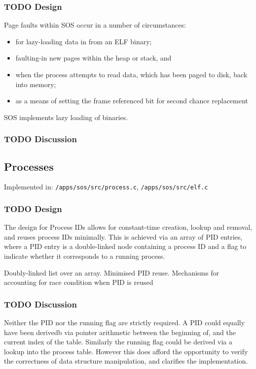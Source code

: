 \documentclass[a4paper,12pt]{article}
\begin{document}
\subsubsection{TODO Design}
Page faults within SOS occur in a number of circumstances:

\begin{itemize}
\item for lazy-loading data in from an ELF binary;
\item faulting-in new pages within the heap or stack, and
\item when the process attempts to read data, which has been paged to disk, back into memory;
\item as a means of setting the frame referenced bit for second chance replacement
\end{itemize}

SOS implements lazy loading of binaries.  
\subsubsection{TODO Discussion}

\subsection{Processes}
Implemented in: \texttt{/apps/sos/src/process.c}, \texttt{/apps/sos/src/elf.c}

\subsubsection{TODO Design}
The design for Process IDs allows for constant-time creation, lookup and
removal, and reuses process IDs minimally.  This is achieved via an array of
PID entries, where a PID entry is a double-linked node containing a process ID
and a flag to indicate whether it corresponds to a running process.


Doubly-linked list over an array.
Minimised PID reuse.
Mechanisms for accounting for race condition when PID is reused

\subsubsection{TODO Discussion}
Neither the PID nor the running flag are strictly required.  A PID could
equally have been derivedb via pointer arithmetic between the beginning of,
and the current index of the table.  Similarly the running flag could be
derived via a lookup into the process table.  However this does afford the
opportunity to verify the correctness of data structure manipulation, and
clarifies the implementation.
\end{document}
